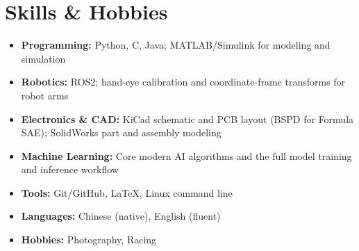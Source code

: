 \documentclass[letterpaper,10pt]{article}
\begin{document}

\section{Skills \& Hobbies}
\begin{itemize}
    \item \textbf{Programming:} Python, C, Java; MATLAB/Simulink for modeling and simulation
    \item \textbf{Robotics:} ROS2; hand-eye calibration and coordinate-frame transforms for robot arms
    \item \textbf{Electronics \& CAD:} KiCad schematic and PCB layout (BSPD for Formula SAE); SolidWorks part and assembly modeling
    \item \textbf{Machine Learning:} Core modern AI algorithms and the full model training and inference workflow
    \item \textbf{Tools:} Git/GitHub, \LaTeX, Linux command line
    \item \textbf{Languages:} Chinese (native), English (fluent)
    \item \textbf{Hobbies:} Photography, Racing
\end{itemize}




\end{document}
